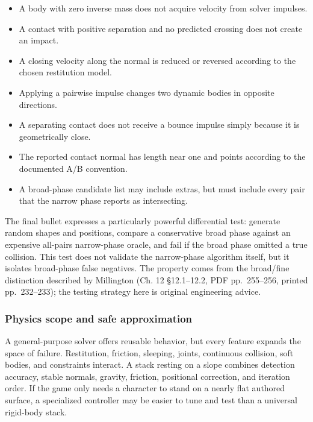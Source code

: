 \begin{itemize}
\tightlist
\item
  A body with zero inverse mass does not acquire velocity from solver impulses.
\item
  A contact with positive separation and no predicted crossing does not create an impact.
\item
  A closing velocity along the normal is reduced or reversed according to the chosen restitution model.
\item
  Applying a pairwise impulse changes two dynamic bodies in opposite directions.
\item
  A separating contact does not receive a bounce impulse simply because it is geometrically close.
\item
  The reported contact normal has length near one and points according to the documented A/B convention.
\item
  A broad-phase candidate list may include extras, but must include every pair that the narrow phase reports as intersecting.
\end{itemize}

The final bullet expresses a particularly powerful differential test: generate random shapes and positions, compare a conservative broad phase against an expensive all-pairs narrow-phase oracle, and fail if the broad phase omitted a true collision. This test does not validate the narrow-phase algorithm itself, but it isolates broad-phase false negatives. The property comes from the broad/fine distinction described by Millington (Ch. 12 §12.1--12.2, PDF pp.~255--256, printed pp.~232--233); the testing strategy here is original engineering advice.

\subsubsection{Physics scope and safe approximation}\label{06-engine-ii-ch033-physics-scope-and-safe-approximation}

A general-purpose solver offers reusable behavior, but every feature expands the space of failure. Restitution, friction, sleeping, joints, continuous collision, soft bodies, and constraints interact. A stack resting on a slope combines detection accuracy, stable normals, gravity, friction, positional correction, and iteration order. If the game only needs a character to stand on a nearly flat authored surface, a specialized controller may be easier to tune and test than a universal rigid-body stack.

